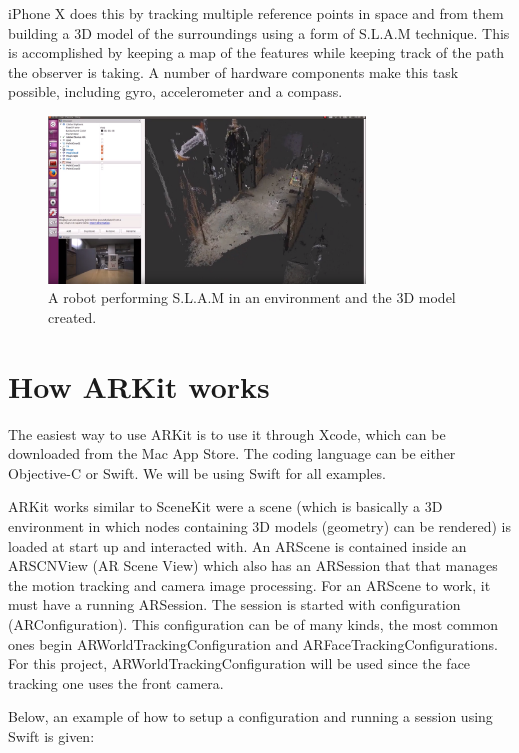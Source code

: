 iPhone X does this by tracking multiple reference points in space and from them building a 3D model of the surroundings using a form of S.L.A.M technique.
This is accomplished by keeping a map of the features while keeping track of the path the observer is taking. A number of 
hardware components make this task possible, including gyro, accelerometer and a compass. \cite{iphoneslam}

\begin{figure}[hbtp]
\begin{center}
\includegraphics[width = 0.75\textwidth]{./Images/slam-map.jpg} 
\caption{A robot performing S.L.A.M in an environment and the 3D model created.}
\label{fig:slam}
\end{center}
\end{figure}

\section{How ARKit works}
\label{subsecARKit}
The easiest way to use ARKit is to use it through Xcode, which can be downloaded from the Mac App Store.
The coding language can be either Objective-C or Swift. We will be using Swift for all
examples.

ARKit works similar to SceneKit were a scene (which is basically a 3D environment in which nodes containing 3D models (geometry) can be rendered) is loaded at start up and interacted with.
An ARScene is contained inside an ARSCNView (AR Scene View) which also has an ARSession
that that manages the motion tracking and camera image processing. For an ARScene to work, it must have a running ARSession.
The session is started with configuration (ARConfiguration). This configuration can be of many kinds, the most common ones begin ARWorldTrackingConfiguration and ARFaceTrackingConfigurations. For this project, ARWorldTrackingConfiguration will be used since the face tracking one uses the front camera.

Below, an example of how to setup a configuration and running a session using Swift is given:

